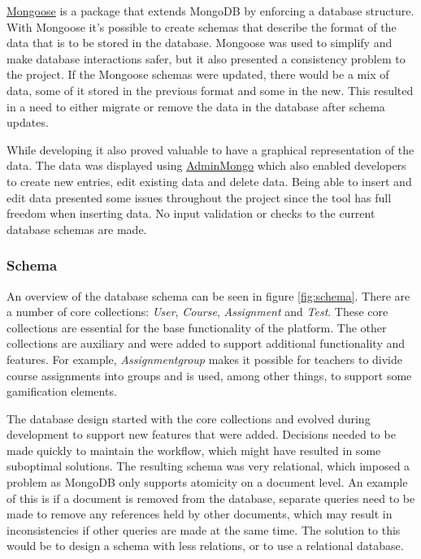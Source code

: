 \href{http://www.mongoosejs.com}{Mongoose} is a package that extends MongoDB by enforcing a database structure. With Mongoose it's possible to create schemas that describe the format of the data that is to be stored in the database. Mongoose  was used to simplify and make database interactions safer, but it also presented a consistency problem to the project. If the Mongoose schemas were updated, there would be a mix of data, some of it stored in the previous format and some in the new. This resulted in a need to either migrate or remove the data in the database after schema updates.

While developing it also proved valuable to have a graphical representation of the data. The data was displayed using \href{https://github.com/mrvautin/adminMongo}{AdminMongo} which also enabled developers to create new entries, edit existing data and delete data. Being able to insert and edit data presented some issues throughout the project since the tool has full freedom when inserting data. No input validation or checks to the current database schemas are made. 

\subsubsection{Schema}
An overview of the database schema can be seen in figure \ref{fig:schema}. There are a number of core collections: \emph{User}, \emph{Course}, \emph{Assignment} and \emph{Test}. These core collections are essential for the base functionality of the platform. The other collections are auxiliary and were added to support additional functionality and features. For example, \emph{Assignmentgroup} makes it possible for teachers to divide course assignments into groups and is used, among other things, to support some gamification elements.

The database design started with the core collections and evolved during development to support new features that were added. Decisions needed to be made quickly to maintain the workflow, which might have resulted in some suboptimal solutions. The resulting schema was very relational, which imposed a problem as MongoDB only supports atomicity on a document level. An example of this is if a document is removed from the database, separate queries need to be made to remove any references held by other documents, which may result in inconsistencies if other queries are made at the same time. The solution to this would be to design a schema with less relations, or to use a relational database.

